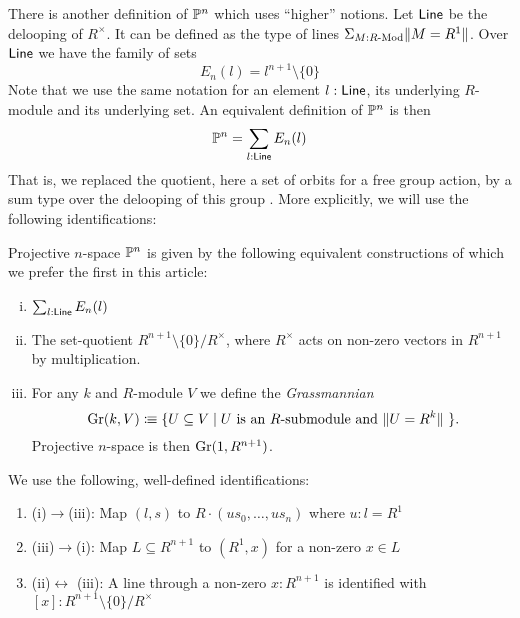 There is another definition of $\mathbb{P}^n$ which uses ``higher'' notions. Let $\mathsf{Line}$ be the delooping
of $R^\times$. It can be defined as the type of lines $\Sigma_{M:R\text{-}\mathrm{Mod}}\|{M=R^1}\|$. Over $\mathsf{Line}$ we have the
family of sets
$$E_n(l) = l^{n+1}\setminus\{0\}$$
Note that we use the same notation for an element $l : \mathsf{Line}$,
its underlying $R$-module and its underlying set.
An equivalent definition of $\mathbb{P}^n$ is then
$$
\mathbb{P}^n = \sum_{l:\mathsf{Line}}E_n(l)
$$
That is, we replaced the quotient, here a set of orbits for a free group action, by a sum type over the delooping of this group
\cite{Sym}.
More explicitly, we will use the following identifications:
\begin{remark}\label{identification-Pn}
  Projective $n$-space $\mathbb{P}^n$ is given by the following equivalent constructions of which we prefer
  the first in this article:
  \begin{center}
  
    \begin{enumerate}[(i)]
    \item $\sum_{l:\mathsf{Line}}E_n(l)$
    \item The set-quotient $R^{n+1}\setminus\{0\}/R^\times$, where $R^\times$ acts on non-zero vectors in $R^{n+1}$ by multiplication.
    \item For any $k$ and $R$-module $V$ we define the \emph{Grassmannian}
      \[ \Gr(k,V)\colonequiv \{ U\subseteq V \mid \text{$U$ is an $R$-submodule and $\|U=R^k\|$ }\} \rlap{.}\]
      Projective $n$-space is then $\mathrm{Gr}(1,R^{n+1})$.
    \end{enumerate}
    
  \end{center}
  We use the following, well-defined identifications:
  \begin{center}
  
  \begin{enumerate}
  \item[] (i)$\to$(iii): Map $(l,s)$ to $R\cdot (u s_0,\dots, u s_n)$ where $u:l=R^1$
  \item[] (iii)$\to $(i): Map $L\subseteq R^{n+1}$ to $(R^1, x)$ for a non-zero $x\in L$
  \item[] (ii)$\leftrightarrow$ (iii): A line through a non-zero $x:R^{n+1}$
          is identified with $[x]:R^{n+1}\setminus\{0\}/R^\times$
  \end{enumerate}
    
  \end{center}
\end{remark}

